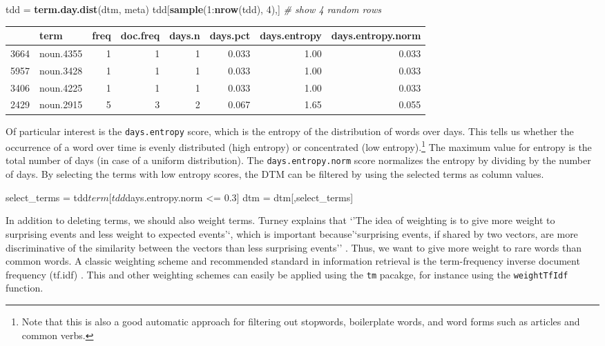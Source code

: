 \documentclass[]{article}
\newenvironment{Shaded}{\begin{snugshade}}{\end{snugshade}}
\newcommand{\KeywordTok}[1]{\textcolor[rgb]{0.13,0.29,0.53}{\textbf{{#1}}}}
\newcommand{\DecValTok}[1]{\textcolor[rgb]{0.00,0.00,0.81}{{#1}}}
\newcommand{\FloatTok}[1]{\textcolor[rgb]{0.00,0.00,0.81}{{#1}}}
\newcommand{\StringTok}[1]{\textcolor[rgb]{0.31,0.60,0.02}{{#1}}}
\newcommand{\CommentTok}[1]{\textcolor[rgb]{0.56,0.35,0.01}{\textit{{#1}}}}
\newcommand{\NormalTok}[1]{{#1}}
\let\rmarkdownfootnote\footnote%
\def\footnote{\protect\rmarkdownfootnote}
\begin{document}
\begin{Shaded}
\begin{Highlighting}[]
\NormalTok{tdd =}\StringTok{ }\KeywordTok{term.day.dist}\NormalTok{(dtm, meta)}
\NormalTok{tdd[}\KeywordTok{sample}\NormalTok{(}\DecValTok{1}\NormalTok{:}\KeywordTok{nrow}\NormalTok{(tdd), }\DecValTok{4}\NormalTok{),] }\CommentTok{# show 4 random rows}
\end{Highlighting}
\end{Shaded}

\begin{longtable}[c]{@{}llrrrrrr@{}}
\toprule
& term & freq & doc.freq & days.n & days.pct & days.entropy &
days.entropy.norm\tabularnewline
\midrule
\endhead
3664 & noun.4355 & 1 & 1 & 1 & 0.033 & 1.00 & 0.033\tabularnewline
5957 & noun.3428 & 1 & 1 & 1 & 0.033 & 1.00 & 0.033\tabularnewline
3406 & noun.4225 & 1 & 1 & 1 & 0.033 & 1.00 & 0.033\tabularnewline
2429 & noun.2915 & 5 & 3 & 2 & 0.067 & 1.65 & 0.055\tabularnewline
\bottomrule
\end{longtable}

Of particular interest is the \texttt{days.entropy} score, which is the
entropy of the distribution of words over days. This tells us whether
the occurrence of a word over time is evenly distributed (high entropy)
or concentrated (low entropy).\footnote{Note that this is also a good
  automatic approach for filtering out stopwords, boilerplate words, and
  word forms such as articles and common verbs.} The maximum value for
entropy is the total number of days (in case of a uniform distribution).
The \texttt{days.entropy.norm} score normalizes the entropy by dividing
by the number of days. By selecting the terms with low entropy scores,
the DTM can be filtered by using the selected terms as column values.

\begin{Shaded}
\begin{Highlighting}[]
\NormalTok{select_terms =}\StringTok{ }\NormalTok{tdd$term[tdd$days.entropy.norm <=}\StringTok{ }\FloatTok{0.3}\NormalTok{]}
\NormalTok{dtm =}\StringTok{ }\NormalTok{dtm[,select_terms]}
\end{Highlighting}
\end{Shaded}

In addition to deleting terms, we should also weight terms. Turney
explains that `'The idea of weighting is to give more weight to
surprising events and less weight to expected events'`, which is
important because'`surprising events, if shared by two vectors, are more
discriminative of the similarity between the vectors than less
surprising events'' \citep[156]{turney02}. Thus, we want to give more
weight to rare words than common words. A classic weighting scheme and
recommended standard in information retrieval is the term-frequency
inverse document frequency (tf.idf) \citep[\citet{monroe08}]{sparck72}.
This and other weighting schemes can easily be applied using the
\texttt{tm} pacakge, for instance using the \texttt{weightTfIdf}
function.
\end{document}
